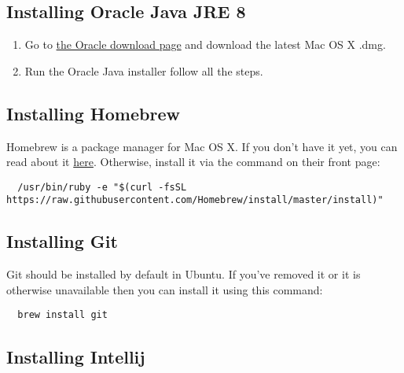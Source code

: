 \documentclass[../setup.tex]{subfiles}
\begin{document}
\subsection{Installing Oracle Java JRE 8}
\begin{enumerate}
  \item
    Go to
    \href{http://www.oracle.com/technetwork/java/javase/downloads/jre8-downloads-2133155.html} {the
    Oracle download page} and download the latest Mac OS X .dmg.
  \item
    Run the Oracle Java installer follow all the steps.
\end{enumerate}

\subsection{Installing Homebrew}
Homebrew is a package manager for Mac OS X. If you don't have it yet, you can read about it
\href{https://brew.sh/} {here}. Otherwise, install it via the command on their front page:
\begin{lstlisting}
  /usr/bin/ruby -e "$(curl -fsSL https://raw.githubusercontent.com/Homebrew/install/master/install)"
\end{lstlisting}

\subsection{Installing Git}
Git should be installed by default in Ubuntu. If you've removed it or it is otherwise unavailable
then you can install it using this command:
\begin{lstlisting}
  brew install git
\end{lstlisting}


	\subsection{Installing Intellij}
\end{document}
